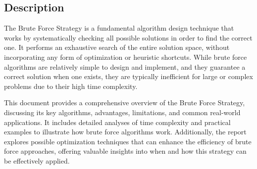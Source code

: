 \subsection{Description}
The Brute Force Strategy is a fundamental algorithm design technique that works by systematically checking all possible solutions in order to find the correct one. It performs an exhaustive search of the entire solution space, without incorporating any form of optimization or heuristic shortcuts. While brute force algorithms are relatively simple to design and implement, and they guarantee a correct solution when one exists, they are typically inefficient for large or complex problems due to their high time complexity.

This document provides a comprehensive overview of the Brute Force Strategy, discussing its key algorithms, advantages, limitations, and common real-world applications. It includes detailed analyses of time complexity and practical examples to illustrate how brute force algorithms work. Additionally, the report explores possible optimization techniques that can enhance the efficiency of brute force approaches, offering valuable insights into when and how this strategy can be effectively applied.